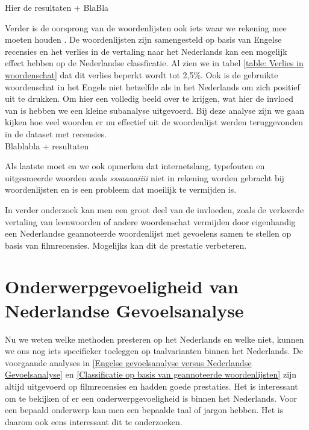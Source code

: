   Hier de resultaten + BlaBla

 Verder is de oorsprong van de woordenlijsten ook iets waar we rekening mee moeten houden . De woordenlijsten zijn samengesteld op basis van Engelse recensies en  het verlies in de vertaling naar het Nederlands kan een mogelijk effect hebben op de Nederlandse classficatie. Al zien we in tabel \ref{table: Verlies in woordenschat} dat dit verlies beperkt wordt tot 2,5\%. Ook is de gebruikte woordenschat in het Engels niet hetzelfde als in het Nederlands om zich positief uit te drukken. Om hier een volledig beeld over te krijgen, wat hier de invloed van is hebben we een kleine subanalyse uitgevoerd. Bij deze analyse zijn we gaan kijken hoe veel woorden er nu effectief uit de woordenlijst werden teruggevonden in de dataset met recensies.\\

 Blablabla + resultaten

Als laatste moet en we ook opmerken dat internetslang, typefouten en uitgesmeerde woorden zoals \textit{sssaaaaiiii} niet in rekening worden gebracht bij woordenlijsten en is een probleem dat moeilijk te vermijden is. 

In verder onderzoek kan men een groot deel van de invloeden, zoals de verkeerde vertaling van leenwoorden of andere woordenschat vermijden door eigenhandig een Nederlandse geannoteerde woordenlijst met gevoelens samen te stellen op basis van filmrecensies. Mogelijks kan dit de prestatie verbeteren.


\section{Onderwerpgevoeligheid van Nederlandse Gevoelsanalyse}\label{Onderwerpgevoeligheid van Nederlandse Gevoelsanalyse}

Nu we weten welke methoden presteren op het Nederlands en welke niet, kunnen we ons nog iets specifieker toeleggen op taalvarianten binnen het Nederlands. De voorgaande analyses in \ref{Engelse gevoelsanalyse versus Nederlandse Gevoelsanalyse} en \ref{Classificatie op basis van geannoteerde woordenlijsten} zijn altijd uitgevoerd op filmrecensies en hadden goede prestaties. Het is interessant om te bekijken of er een onderwerpgevoeligheid is binnen het Nederlands. Voor een bepaald onderwerp kan men een bepaalde taal of jargon hebben. Het is daarom ook eens interessant dit te onderzoeken. \\


